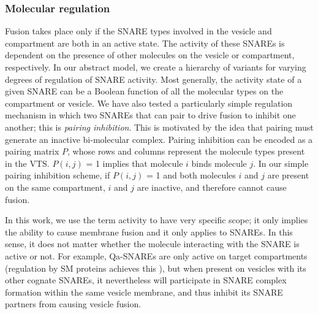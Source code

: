 \subsubsection{Molecular regulation} 
Fusion takes place only if the SNARE types involved in the vesicle and compartment are both in an active state.
%
The activity of these SNAREs is dependent on the presence of other molecules on the vesicle or compartment, respectively.
%
In our abstract model, 
we create a hierarchy of variants for varying degrees of regulation of SNARE activity.
%
Most generally, the activity state of a given SNARE can be a Boolean function of all the molecular types on the compartment or vesicle. 
%
We have also tested \cite{shukla2017discovering} a particularly simple regulation mechanism in which two SNAREs that can pair to drive fusion to inhibit one another; this is \textit{pairing inhibition}. 
%
This is motivated by the idea that pairing must generate an inactive bi-molecular complex.
%
Pairing inhibition can be encoded as a pairing matrix $P$, whose rows and columns represent the molecule types present in the VTS. 
%
$P(i,j)$ = 1 implies that molecule $i$ binds molecule $j$.
%
In our simple pairing inhibition scheme, if $P(i,j)$ = 1 and both molecules $i$ and $j$ are present on the same compartment, $i$ and $j$ are inactive, and therefore cannot cause fusion.

In this work, we use the term activity to have very specific scope; it only implies the ability to cause membrane fusion and it only applies to SNAREs. 
%
In this sense, it does not matter whether the molecule interacting with the SNARE is active or not. 
%
For example, Qa-SNAREs are only active on target compartments (regulation by SM proteins achieves this \cite{baker2016chaperoning}), but when present on vesicles with its other cognate SNAREs, it nevertheless will participate in SNARE complex formation within the same vesicle membrane, and thus inhibit its SNARE partners from causing vesicle fusion.

